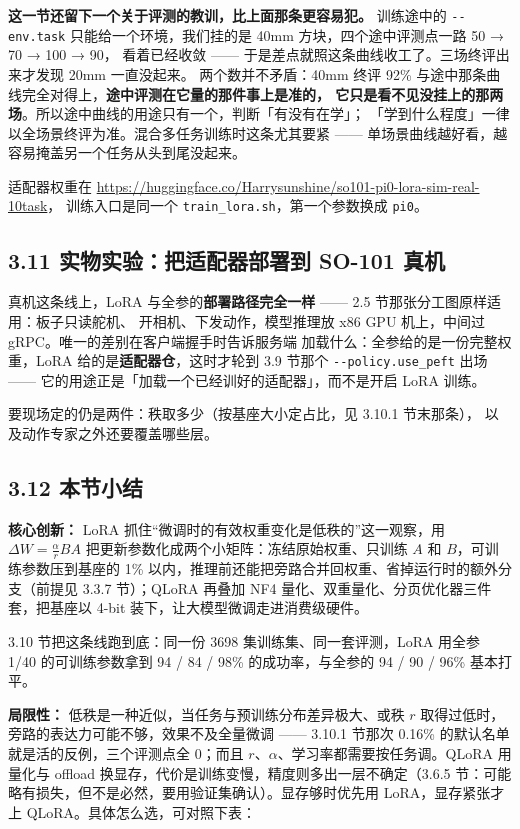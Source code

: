 \documentclass[
  chinese,
]{ctexart}
\begin{document}
\textbf{这一节还留下一个关于评测的教训，比上面那条更容易犯。} 训练途中的
\texttt{-\/-env.task} 只能给一个环境，我们挂的是 40mm
方块，四个途中评测点一路 50 → 70 → 100 → 90， 看着已经收敛 ------
于是差点就照这条曲线收工了。三场终评出来才发现 20mm 一直没起来。
两个数并不矛盾：40mm 终评 92\%
与途中那条曲线完全对得上，\textbf{途中评测在它量的那件事上是准的，
它只是看不见没挂上的那两场}。所以途中曲线的用途只有一个，判断「有没有在学」；
「学到什么程度」一律以全场景终评为准。混合多任务训练时这条尤其要紧
------ 单场景曲线越好看，越容易掩盖另一个任务从头到尾没起来。

适配器权重在
\url{https://huggingface.co/Harrysunshine/so101-pi0-lora-sim-real-10task}，
训练入口是同一个 \texttt{train\_lora.sh}，第一个参数换成 \texttt{pi0}。

\subsection{3.11 实物实验：把适配器部署到 SO-101
真机}\label{ux5b9eux7269ux5b9eux9a8cux628aux9002ux914dux5668ux90e8ux7f72ux5230-so-101-ux771fux673a}

真机这条线上，LoRA 与全参的\textbf{部署路径完全一样} ------ 2.5
节那张分工图原样适用：板子只读舵机、 开相机、下发动作，模型推理放 x86
GPU 机上，中间过 gRPC。唯一的差别在客户端握手时告诉服务端
加载什么：全参给的是一份完整权重，LoRA
给的是\textbf{适配器仓}，这时才轮到 3.9 节那个
\texttt{-\/-policy.use\_peft} 出场 ------
它的用途正是「加载一个已经训好的适配器」，而不是开启 LoRA 训练。

要现场定的仍是两件：秩取多少（按基座大小定占比，见 3.10.1 节末那条），
以及动作专家之外还要覆盖哪些层。

\subsection{3.12 本节小结}\label{ux672cux8282ux5c0fux7ed3-2}

\textbf{核心创新：} LoRA
抓住``微调时的有效权重变化是低秩的''这一观察，用
\(\Delta W = \frac{\alpha}{r} BA\)
把更新参数化成两个小矩阵：冻结原始权重、只训练 \(A\) 和
\(B\)，可训练参数压到基座的 1\%
以内，推理前还能把旁路合并回权重、省掉运行时的额外分支（前提见 3.3.7
节）；QLoRA 再叠加 NF4 量化、双重量化、分页优化器三件套，把基座以 4-bit
装下，让大模型微调走进消费级硬件。

3.10 节把这条线跑到底：同一份 3698 集训练集、同一套评测，LoRA 用全参
1/40 的可训练参数拿到 94 / 84 / 98\% 的成功率，与全参的 94 / 90 / 96\%
基本打平。

\textbf{局限性：} 低秩是一种近似，当任务与预训练分布差异极大、或秩 \(r\)
取得过低时，旁路的表达力可能不够，效果不及全量微调 ------ 3.10.1 节那次
0.16\% 的默认名单就是活的反例，三个评测点全 0；而且
\(r\)、\(\alpha\)、学习率都需要按任务调。QLoRA 用量化与 offload
换显存，代价是训练变慢，精度则多出一层不确定（3.6.5
节：可能略有损失，但不是必然，要用验证集确认）。显存够时优先用
LoRA，显存紧张才上 QLoRA。具体怎么选，可对照下表：
\end{document}
